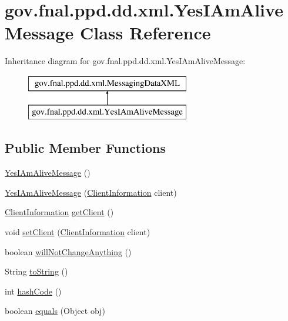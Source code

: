 \hypertarget{classgov_1_1fnal_1_1ppd_1_1dd_1_1xml_1_1YesIAmAliveMessage}{\section{gov.\-fnal.\-ppd.\-dd.\-xml.\-Yes\-I\-Am\-Alive\-Message Class Reference}
\label{classgov_1_1fnal_1_1ppd_1_1dd_1_1xml_1_1YesIAmAliveMessage}
}
Inheritance diagram for gov.\-fnal.\-ppd.\-dd.\-xml.\-Yes\-I\-Am\-Alive\-Message\-:\begin{figure}[H]
\begin{center}
\leavevmode
\includegraphics[height=2.000000cm]{classgov_1_1fnal_1_1ppd_1_1dd_1_1xml_1_1YesIAmAliveMessage}
\end{center}
\end{figure}
\subsection*{Public Member Functions}
\begin{DoxyCompactItemize}
\item 
\hyperlink{classgov_1_1fnal_1_1ppd_1_1dd_1_1xml_1_1YesIAmAliveMessage_a346f2dd0b0bcae2e26b802e19cc586f9}{Yes\-I\-Am\-Alive\-Message} ()
\item 
\hyperlink{classgov_1_1fnal_1_1ppd_1_1dd_1_1xml_1_1YesIAmAliveMessage_ad0cc71d9a79ad0df675d88ff780589f3}{Yes\-I\-Am\-Alive\-Message} (\hyperlink{classgov_1_1fnal_1_1ppd_1_1dd_1_1xml_1_1ClientInformation}{Client\-Information} client)
\item 
\hyperlink{classgov_1_1fnal_1_1ppd_1_1dd_1_1xml_1_1ClientInformation}{Client\-Information} \hyperlink{classgov_1_1fnal_1_1ppd_1_1dd_1_1xml_1_1YesIAmAliveMessage_af72c878eba0ff167ffa4b0003b00a68d}{get\-Client} ()
\item 
void \hyperlink{classgov_1_1fnal_1_1ppd_1_1dd_1_1xml_1_1YesIAmAliveMessage_a77e68b399a59310f0647e8d5fa942294}{set\-Client} (\hyperlink{classgov_1_1fnal_1_1ppd_1_1dd_1_1xml_1_1ClientInformation}{Client\-Information} client)
\item 
boolean \hyperlink{classgov_1_1fnal_1_1ppd_1_1dd_1_1xml_1_1YesIAmAliveMessage_abb40ad3b8d1fe33692a9e6c79a25f503}{will\-Not\-Change\-Anything} ()
\item 
String \hyperlink{classgov_1_1fnal_1_1ppd_1_1dd_1_1xml_1_1YesIAmAliveMessage_a996aec9358aeb9d20aa0ee710770448c}{to\-String} ()
\item 
int \hyperlink{classgov_1_1fnal_1_1ppd_1_1dd_1_1xml_1_1YesIAmAliveMessage_a4f07b87145751f97536aa0363ac19a0e}{hash\-Code} ()
\item 
boolean \hyperlink{classgov_1_1fnal_1_1ppd_1_1dd_1_1xml_1_1YesIAmAliveMessage_a080d826e369588ededfa3a46fdcf6063}{equals} (Object obj)
\end{DoxyCompactItemize}


